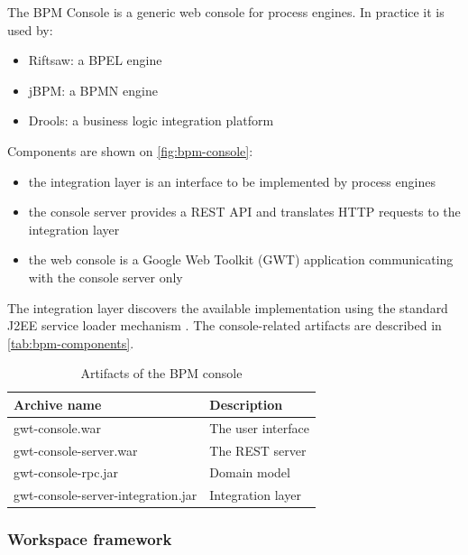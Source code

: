 The BPM Console is a generic web console for process engines. In practice it is
used by:

\begin{itemize}
\item Riftsaw: a BPEL engine
\item jBPM: a BPMN engine
\item Drools: a business logic integration platform
\end{itemize}

Components are shown on \autoref{fig:bpm-console}:

\begin{itemize}
\item the integration layer is an interface to be implemented by process engines
\item the console server provides a REST API and translates HTTP requests to the integration layer
\item the web console is a Google Web Toolkit (GWT) application communicating with the console server only
\end{itemize}

The integration layer discovers the available implementation using the standard
J2EE service loader mechanism \cite{service-loader}. The console-related
artifacts are described in \autoref{tab:bpm-components}.

\begin{table}[H]
  \begin{center}
    \begin{tabular}{| l | l |}
    \hline
    \textbf{Archive name} & \textbf{Description} \\ \hline
    gwt-console.war & The user interface \\ \hline
    gwt-console-server.war & The REST server \\ \hline
    gwt-console-rpc.jar & Domain model \\ \hline
    gwt-console-server-integration.jar & Integration layer \\ \hline
    \end{tabular}
  \end{center}
  \caption{Artifacts of the BPM console}
  \label{tab:bpm-components}
\end{table}

\subsubsection*{Workspace framework}


